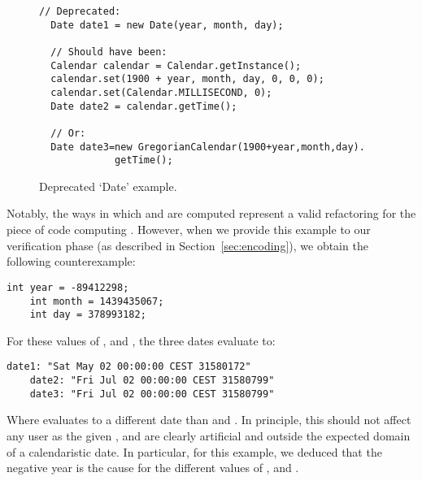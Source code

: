 \documentclass[sigconf,review,anonymous]{acmart}
\begin{document}

\begin{figure}
  \begin{lstlisting}[mathescape=true,showstringspaces=false]
  // Deprecated:
  Date date1 = new Date(year, month, day);

  // Should have been:
  Calendar calendar = Calendar.getInstance();
  calendar.set(1900 + year, month, day, 0, 0, 0);
  calendar.set(Calendar.MILLISECOND, 0);
  Date date2 = calendar.getTime();
    
  // Or:
  Date date3=new GregorianCalendar(1900+year,month,day).
             getTime();
  \end{lstlisting}
\caption{Deprecated `Date' example.}
\label{ex:three-dates}
\end{figure}

Notably, the ways in which  and  are computed
represent a valid refactoring for the piece of code computing
. However, when we provide this example to our
verification phase (as described in Section~\ref{sec:encoding}), we obtain the following
counterexample:

  \begin{lstlisting}[mathescape=true,showstringspaces=false]
    int year = -89412298;
    int month = 1439435067;
    int day = 378993182;
  \end{lstlisting}

  For these values of ,  and , the three
  dates evaluate to:

  \begin{lstlisting}[mathescape=true,showstringspaces=false]
    date1: "Sat May 02 00:00:00 CEST 31580172"
    date2: "Fri Jul 02 00:00:00 CEST 31580799"
    date3: "Fri Jul 02 00:00:00 CEST 31580799"
  \end{lstlisting}

  Where  evaluates to a different date than  and . In principle, this should not affect any user as the given
  ,  and  are clearly artificial and outside the expected domain of a calendaristic date.
  In particular, for this example, we deduced that the negative year is the cause for the different values of ,  and .
\end{document}
